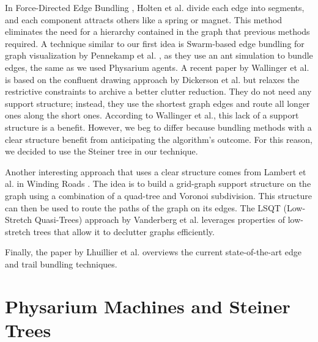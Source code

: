 In Force-Directed Edge Bundling \cite{holten_force-directed_2009}, Holten et al. divide each edge into segments, and each component attracts others like a spring or magnet. This method eliminates the need for a hierarchy contained in the graph that previous methods required. A technique similar to our first idea is Swarm-based edge bundling for graph visualization by Pennekamp et al. \cite{pennekamp_swarm-based_2019}, as they use an ant simulation to bundle edges, the same as we used Physarium agents. A recent paper by Wallinger et al. \cite{wallinger_edge-path_2022} is based on the confluent drawing approach by Dickerson et al. \cite{dickerson_confluent_2002} but relaxes the restrictive constraints to archive a better clutter reduction. They do not need any support structure; instead, they use the shortest graph edges and route all longer ones along the short ones. According to Wallinger et al., this lack of a support structure is a benefit. However, we beg to differ because bundling methods with a clear structure benefit from anticipating the algorithm's outcome. For this reason, we decided to use the Steiner tree in our technique.

Another interesting approach that uses a clear structure comes from Lambert et al. in Winding Roads \cite{lambert_winding_2010}. The idea is to build a grid-graph support structure on the graph using a combination of a quad-tree and Voronoi subdivision. This structure can then be used to route the paths of the graph on its edges. The LSQT (Low-Stretch Quasi-Trees) approach by Vanderberg et al. \cite{vandenberg_lsqt_2020} leverages properties of low-stretch trees that allow it to declutter graphs efficiently. 

Finally, the paper by Lhuillier et al. \cite{lhuillier_state_2017} overviews the current state-of-the-art edge and trail bundling techniques.

\section{Physarium Machines and Steiner Trees}
\label{sec:physariumPolycephalum}

